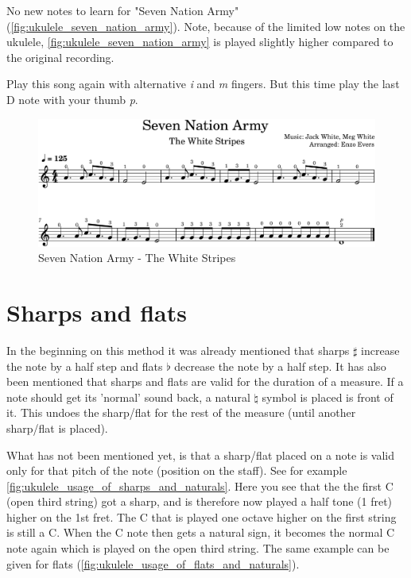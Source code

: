\newpage

No new notes to learn for "Seven Nation Army" (\autoref{fig:ukulele_seven_nation_army}). Note, because of the limited low notes on the ukulele, \autoref{fig:ukulele_seven_nation_army} is played slightly higher compared to the original recording.

Play this song again with alternative \textit{i} and \textit{m} fingers. But this time play the last D note with your thumb \textit{p}.

\begin{figure}[h]
	\centering
	\includegraphics[width=\textwidth]{../../MuseScore/Ukulele/UkuleleSevenNationArmyTheWhiteStripes.png}
	\caption{Seven Nation Army - The White Stripes}
	\label{fig:ukulele_seven_nation_army}
\end{figure}

\newpage

\section{Sharps and flats}

In the beginning on this method it was already mentioned that sharps $\sharp$ increase the note by a half step and flats $\flat$ decrease the note by a half step. It has also been mentioned that sharps and flats are valid for the duration of a measure. If a note should get its 'normal' sound back, a natural $\natural$ symbol is placed is front of it. This undoes the sharp/flat for the rest of the measure (until another sharp/flat is placed).

What has not been mentioned yet, is that a sharp/flat placed on a note is valid only for that pitch of the note (position on the staff). See for example \autoref{fig:ukulele_usage_of_sharps_and_naturals}. Here you see that the the first C (open third string) got a sharp, and is therefore now played a half tone (1 fret) higher on the 1st fret. The C that is played one octave higher on the first string is still a C. When the C note then gets a natural sign, it becomes the normal C note again which is played on the open third string. The same example can be given for flats (\autoref{fig:ukulele_usage_of_flats_and_naturals}).

